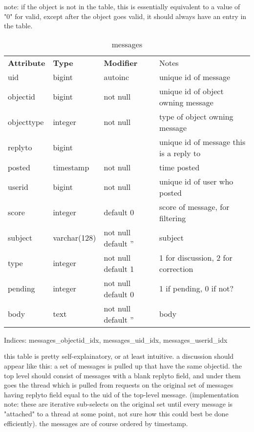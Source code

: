 note: if the object is not in the table, this is essentially equivalent to a value of "0" for valid, except after the object goes valid, it should always have an entry in the table.

\begin{table}
\begin{center}
\begin{tabular}{llll}
{\bf Attribute } & {\bf Type} & {\bf Modifier} & Notes \\
 uid        & bigint       & autoinc            &  unique id of message  \\
 objectid   & bigint       & not null           &  unique id of object owning message \\
 objecttype & integer      & not null           &  type of object owning message \\
 replyto    & bigint       &                    &  unique id of message this is a reply to \\
 posted     & timestamp    & not null           &  time posted \\
 userid     & bigint       & not null           &  unique id of user who posted \\
 score      & integer      & default 0          &  score of message, for filtering \\
 subject    & varchar(128) & not null default ''&  subject \\
 type       & integer      & not null default 1 &  1 for discussion, 2 for correction \\
 pending    & integer      & not null default 0 &  1 if pending, 0 if not? \\
 body       & text         & not null default ''&  body 
\end{tabular}
\end{center}
\caption{messages}
\end{table}

Indices: messages\_objectid\_idx,
         messages\_uid\_idx,
         messages\_userid\_idx	  


this table is pretty self-explainatory, or at least intuitive.  a discussion should appear like this: a set of messages is pulled up that have the same objectid.  the top level should consist of messages with a blank replyto field, and under them goes the thread which is pulled from requests on the original set of messages having replyto field equal to the uid of the top-level message.  (implementation note: these are iterative sub-selects on the original set until every message is "attached" to a thread at some point, not sure how this could best be done efficiently). the messages are of course ordered by timestamp. 

